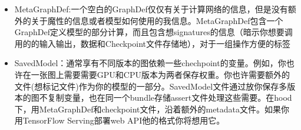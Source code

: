 \begin{itemize}
\item MetaGraphDef:一个空白的GraphDef仅仅有关于计算网络的信息，但是没有额外的关于魔性的信息或者模型如何使用的我信息。MetaGraphDef包含一个GraphDef定义模型的部分计算，而且包含想signatures的信息（暗示你想要调用的的输入输出，数据和Checkpoint文件存储地），对于一组操作方便的标签
\item SavedModel：通常享有不同版本的图依赖一些chechpoint的变量。例如，你也许在一张图上需要需要GPU和CPU版本为两者保存权重。你也许需要额外的文件(想标记文件)作为你的模型的一部分。SavedModel文件通过放你保存多版本的图不复制变量，也在同一个bundle存储assert文件处理这些需要。在hood下，用MetaGraphDef和checkpoint文件，沿着额外的metadata文件。如果你用TensorFlow Serving部署web API他的格式你将想用它。
\end{itemize}






































